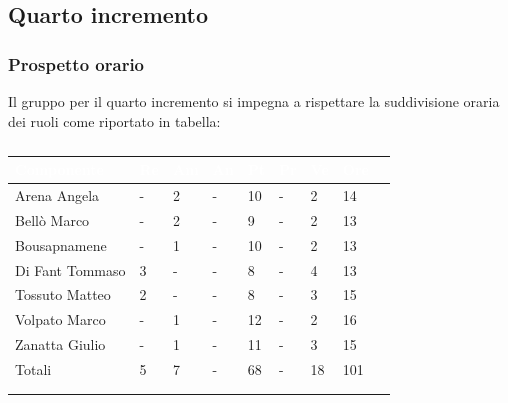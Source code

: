     \subsection{Quarto incremento} 
    {
    \subsubsection{Prospetto orario}
    {
    Il gruppo per il quarto incremento si impegna a rispettare la suddivisione oraria dei ruoli come riportato in tabella:
      \setlength{\freewidth}{\dimexpr\textwidth-30\tabcolsep}
      \renewcommand{\arraystretch}{1.0}
      \setlength{\aboverulesep}{0pt}
      \setlength{\belowrulesep}{0pt}
      \begin{longtable}{C{.4\freewidth} C{.1\freewidth} C{.1\freewidth} C{.1\freewidth} C{.1\freewidth} C{.1\freewidth} C{.1\freewidth} C{.1\freewidth} C{.1\freewidth}}
      \toprule
      \textcolor{white}{\textbf{Componente}}&
      \textcolor{white}{\textbf{Re}}&
      \textcolor{white}{\textbf{Am}}&
      \textcolor{white}{\textbf{An}}&
      \textcolor{white}{\textbf{Pt}}&
      \textcolor{white}{\textbf{Pr}}&
      \textcolor{white}{\textbf{Ve}}&
      \textcolor{white}{\textbf{Ore}}\\
      \toprule
      \endhead

      Arena Angela & - & 2 & -  & 10 & - & 2 & 14 \\      
      Bellò Marco & - & 2 & - & 9 & - & 2 & 13 \\      
      Bousapnamene & - & 1 & - & 10 & - & 2 & 13 \\      
      Di Fant Tommaso & 3 & - & - & 8 & - & 4 & 13 \\      
      Tossuto Matteo & 2 & - & - & 8 & - & 3 & 15 \\      
      Volpato Marco & - & 1 & - & 12 & - & 2 & 16 \\      
      Zanatta Giulio & - & 1 & - & 11 & - & 3 & 15 \\      
      Totali & 5 & 7 & - & 68 & - & 18 & 101 \\
      \bottomrule
      \\
      \caption{}

      \end{longtable} 

}}
